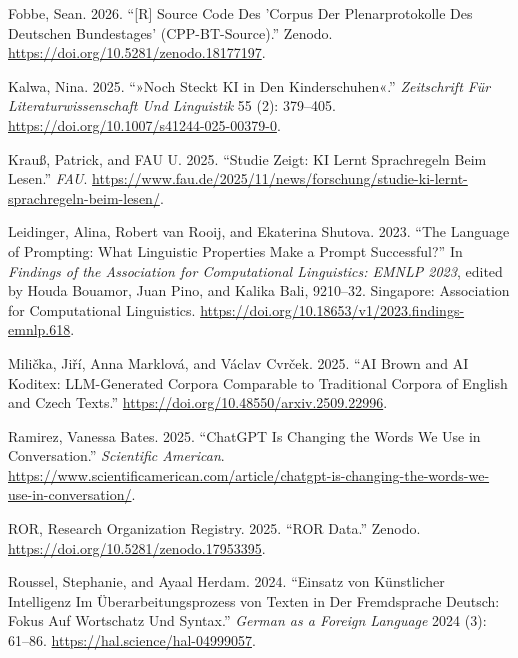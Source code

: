 \documentclass[
  letterpaper,
  DIV=11,
  numbers=noendperiod]{scrartcl}
\newlength{\cslhangindent}
\newenvironment{CSLReferences}[2] %
 {\begin{list}{}{%
  \setlength{\itemindent}{0pt}
  \setlength{\leftmargin}{0pt}
  \setlength{\parsep}{0pt}
  \ifodd #1
   \setlength{\leftmargin}{\cslhangindent}
   \setlength{\itemindent}{-1\cslhangindent}
  \fi
  \setlength{\itemsep}{#2\baselineskip}}}
 {\end{list}}
\begin{document}
\begin{CSLReferences}{1}{0}
Fobbe, Sean. 2026. {``{[}{R}{]} {Source} {Code} Des '{Corpus} Der
{Plenarprotokolle} Des {Deutschen} {Bundestages}'
({CPP}-{BT}-{Source}).''} Zenodo.
\url{https://doi.org/10.5281/zenodo.18177197}.

Kalwa, Nina. 2025. {``»{Noch} Steckt {KI} in Den {Kinderschuhen}«.''}
\emph{Zeitschrift Für Literaturwissenschaft Und Linguistik} 55 (2):
379--405. \url{https://doi.org/10.1007/s41244-025-00379-0}.

Krauß, Patrick, and FAU U. 2025. {``Studie Zeigt: {KI} Lernt
{Sprachregeln} Beim {Lesen}.''} \emph{FAU}.
\url{https://www.fau.de/2025/11/news/forschung/studie-ki-lernt-sprachregeln-beim-lesen/}.

Leidinger, Alina, Robert van Rooij, and Ekaterina Shutova. 2023. {``The
Language of Prompting: {What} Linguistic Properties Make a Prompt
Successful?''} In \emph{Findings of the {Association} for
{Computational} {Linguistics}: {EMNLP} 2023}, edited by Houda Bouamor,
Juan Pino, and Kalika Bali, 9210--32. Singapore: Association for
Computational Linguistics.
\url{https://doi.org/10.18653/v1/2023.findings-emnlp.618}.

Milička, Jiří, Anna Marklová, and Václav Cvrček. 2025. {``{AI} {Brown}
and {AI} {Koditex}: {LLM}-{Generated} {Corpora} {Comparable} to
{Traditional} {Corpora} of {English} and {Czech} {Texts}.''}
\url{https://doi.org/10.48550/arxiv.2509.22996}.

Ramirez, Vanessa Bates. 2025. {``{ChatGPT} {Is} {Changing} the {Words}
{We} {Use} in {Conversation}.''} \emph{Scientific American}.
\url{https://www.scientificamerican.com/article/chatgpt-is-changing-the-words-we-use-in-conversation/}.

ROR, Research Organization Registry. 2025. {``{ROR} {Data}.''} Zenodo.
\url{https://doi.org/10.5281/zenodo.17953395}.

Roussel, Stephanie, and Ayaal Herdam. 2024. {``Einsatz von Künstlicher
{Intelligenz} Im Überarbeitungsprozess von {Texten} in Der
{Fremdsprache} {Deutsch}: {Fokus} Auf {Wortschatz} Und {Syntax}.''}
\emph{German as a Foreign Language} 2024 (3): 61--86.
\url{https://hal.science/hal-04999057}.


\end{CSLReferences}
\end{document}
